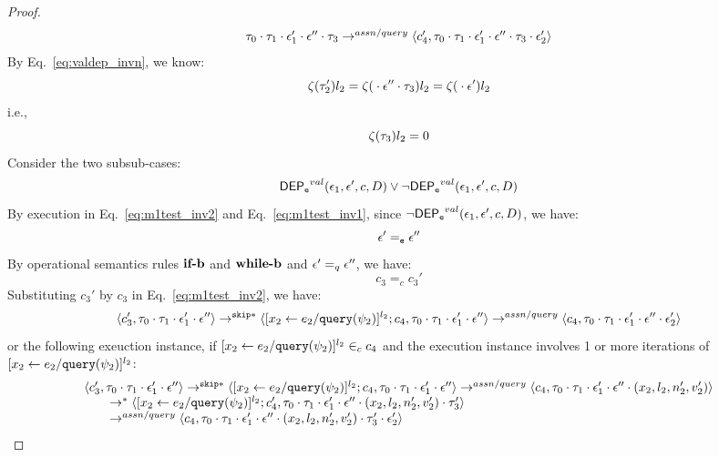 {\begin{proof}
\begin{equation}
\begin{array}{l}
{  \ensuremath{\mathtt{\tau}}_0 \cdot \ensuremath{\mathtt{\tau}}_1 \cdot \ensuremath{\mathtt{\epsilon}}_1' \cdot \ensuremath{\mathtt{\epsilon}}'' \cdot \ensuremath{\mathtt{\tau}}_3}
  \rightarrow^{assn/query} 
  \langle {c}_4',  \mathtt{\tau}_0 \cdot \mathtt{\tau}_1 \cdot \mathtt{\epsilon}_1' \cdot \mathtt{\epsilon}'' \cdot \mathtt{\tau}_3 \cdot \mathtt{\epsilon}_2' \rangle 
\end{array}
\end{equation}
By Eq.~\ref{eq:valdep_invn}, we know:
%
\[
\mathtt{\zeta}(\mathtt{\tau}_2') l_2  = \mathtt{\zeta}({} \cdot {} \mathtt{\epsilon}'' \cdot \mathtt{\tau}_3) l_2 = \mathtt{\zeta}({} \cdot {} \mathtt{\epsilon}') l_2 
 \]
i.e., 
\[
  \mathtt{\zeta}(\mathtt{\tau}_3) l_2 = 0
\]
Consider the two subsub-cases: 
%
$$
\mathsf{DEP_{\mathtt{e}}}^{val}(\mathtt{\epsilon}_1, \mathtt{\epsilon}', c, D) \lor \neg\mathsf{DEP_{\mathtt{e}}}^{val}(\mathtt{\epsilon}_1, \mathtt{\epsilon}', c, D)
$$
%
By execution in Eq.~\ref{eq:m1test_inv2} and Eq.~\ref{eq:m1test_inv1}, 
since $\neg\mathsf{DEP_{\mathtt{e}}}^{val}(\mathtt{\epsilon}_1, \mathtt{\epsilon}', c, D)$, we have:
\[
  \mathtt{\epsilon}' =_{\mathtt{e}} \mathtt{\epsilon}''
\]
By operational semantics rules $\rname{if-b}$ and $\rname{while-b}$ and $\mathtt{\epsilon}' =_q \mathtt{\epsilon}''$, we have:
\[
 c_3 =_c c_3'
\]
%
Substituting $c_3'$ by $c_3$ in Eq.~\ref{eq:m1test_inv2}, we have:
\[
  \langle c_3', \mathtt{\tau}_0 \cdot \mathtt{\tau}_1 \cdot \mathtt{\epsilon}_1' \cdot \mathtt{\epsilon}'' \rangle 
  \rightarrow^{\mathtt{skip}*} 
  \langle [\mathrel{ {x}_2 \leftarrow e_2 / {\tt query}(\psi_2) }]^{l_2};{c}_4, 
  \mathtt{\tau}_0 \cdot \mathtt{\tau}_1 \cdot \mathtt{\epsilon}_1' \cdot \mathtt{\epsilon}'' \rangle
  \rightarrow^{assn/query} 
  \langle {c}_4,  \mathtt{\tau}_0 \cdot \mathtt{\tau}_1 \cdot \mathtt{\epsilon}_1' \cdot \mathtt{\epsilon}'' \cdot \mathtt{\epsilon}_2' \rangle 
\]
%
or the following exeuction instance, 
if $[\mathrel{ {x}_2 \leftarrow e_2 / {\tt query}(\psi_2) }]^{l_2} \in_c c_4$ and 
the execution instance involves 1 or more iterations of $[\mathrel{ {x}_2 \leftarrow e_2 / {\tt query}(\psi_2) }]^{l_2}$:
%
\[
 \begin{array}{l}
  \langle c_3', \mathtt{\tau}_0 \cdot \mathtt{\tau}_1 \cdot \mathtt{\epsilon}_1' \cdot \mathtt{\epsilon}'' \rangle 
  \rightarrow^{\mathtt{skip}*} 
  \langle [\mathrel{ {x}_2 \leftarrow e_2 / {\tt query}(\psi_2) }]^{l_2};{c}_4, 
  \mathtt{\tau}_0 \cdot \mathtt{\tau}_1 \cdot \mathtt{\epsilon}_1' \cdot \mathtt{\epsilon}'' \rangle
  \rightarrow^{assn/query} 
  \langle {c}_4,  \mathtt{\tau}_0 \cdot \mathtt{\tau}_1 \cdot \mathtt{\epsilon}_1' \cdot \mathtt{\epsilon}'' \cdot (x_2, l_2, n_2', v_2') \rangle 
  \\ \qquad 
  \rightarrow^{*} 
  \langle [\mathrel{ {x}_2 \leftarrow e_2 / {\tt query}(\psi_2) }]^{l_2};{c}_4', 
  \mathtt{\tau}_0 \cdot \mathtt{\tau}_1 \cdot \mathtt{\epsilon}_1' \cdot \mathtt{\epsilon}''\cdot (x_2, l_2, n_2', v_2') \cdot \mathtt{\tau}_3' \rangle
  \\ \qquad 
  \rightarrow^{assn/query} 
  \langle {c}_4,  \mathtt{\tau}_0 \cdot \mathtt{\tau}_1 \cdot \mathtt{\epsilon}_1' \cdot \mathtt{\epsilon}'' \cdot (x_2, l_2, n_2', v_2')\cdot \mathtt{\tau}_3' \cdot \mathtt{\epsilon}_2' \rangle 
 \end{array} 
\]
\end{proof}}
